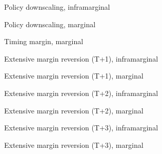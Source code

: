 \documentclass[9pt]{beamer}
\begin{document}
{
}

\begin{frame}{Policy downscaling, inframarginal}
   \footnotesize 
\end{frame}

\begin{frame}{Policy downscaling, marginal}
   \footnotesize 
\end{frame}

\begin{frame}{Timing margin, marginal}
   \tiny 
\end{frame}

\begin{frame}{Extensive margin reversion (T+1), inframarginal}
   \tiny 
\end{frame}

\begin{frame}{Extensive margin reversion (T+1), marginal}
   \tiny 
\end{frame}

\begin{frame}{Extensive margin reversion (T+2), inframarginal}
   \tiny 
\end{frame}

\begin{frame}{Extensive margin reversion (T+2), marginal}
   \tiny 
\end{frame}
\begin{frame}{Extensive margin reversion (T+3), inframarginal}
   \tiny 
\end{frame}

\begin{frame}{Extensive margin reversion (T+3), marginal}
   \tiny 
\end{frame}
\end{document}
